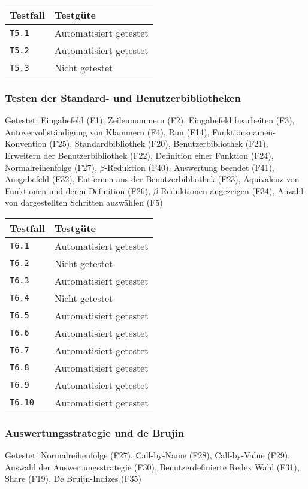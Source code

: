 \documentclass[parskip=full,11pt,twoside]{scrartcl}
\newcommand{\testline}[2]{
    \texttt{#1} & 
    \ifthenelse{\equal{#2}{Nicht getestet}}
        {\cellcolor{red!20}}
        {}
    \ifthenelse{\equal{#2}{Manuell getestet}}
        {\cellcolor{LimeGreen!20}}
        {}
    \ifthenelse{\equal{#2}{Automatisiert getestet}}
        {\cellcolor{green!20}}
        {}
    \ifthenelse{\equal{#2}{Nicht testbar}}
    {\cellcolor{gray!20}}
     {}
    #2 \\ \hline
}
\begin{document}
    \label{shortcuts}
    \begin{center}
        \begin{tabular}{ p{9cm} p{4cm}}
            Testfall & Testgüte \\ \hline
            \testline{T5.1}{Automatisiert getestet}
            \testline{T5.2}{Automatisiert getestet}
            \testline{T5.3}{Nicht getestet}
        \end{tabular}
    \end{center}

\subsubsection{Testen der Standard- und Benutzerbibliotheken}
    Getestet:
    Eingabefeld (F1),
    Zeilennummern (F2),
    Eingabefeld bearbeiten (F3),
    Autovervollständigung von Klammern (F4),
    Run (F14),
    Funktionsnamen-Konvention (F25),
    Standardbibliothek (F20),
    Benutzerbibliothek (F21),
    Erweitern der Benutzerbibliothek (F22),
    Definition einer Funktion (F24),
    Normalreihenfolge (F27),
    $\beta$-Reduktion (F40),
    Auswertung beendet (F41),
    Ausgabefeld (F32),
    Entfernen aus der Benutzerbibliothek (F23),
    Äquivalenz von Funktionen und deren Definition (F26),
    $\beta$-Reduktionen angezeigen (F34),
    Anzahl von dargestellten Schritten auswählen (F5)

    \label{shortcuts}
    \begin{center}
        \begin{tabular}{ p{9cm} p{4cm}}
            Testfall & Testgüte \\ \hline
            \testline{T6.1}{Automatisiert getestet}
            \testline{T6.2}{Nicht getestet}
            \testline{T6.3}{Automatisiert getestet}
            \testline{T6.4}{Nicht getestet}
            \testline{T6.5}{Automatisiert getestet}
            \testline{T6.6}{Automatisiert getestet}
            \testline{T6.7}{Automatisiert getestet}
            \testline{T6.8}{Automatisiert getestet}
            \testline{T6.9}{Automatisiert getestet}
            \testline{T6.10}{Automatisiert getestet}
        \end{tabular}
    \end{center}

\subsubsection{Auswertungsstrategie und de Brujin}
    Getestet:
    Normalreihenfolge (F27),
    Call-by-Name (F28),
    Call-by-Value (F29),
    Auswahl der Auswertungsstrategie (F30),
    Benutzerdefinierte Redex Wahl (F31),
    Share (F19),
    De Bruijn-Indizes (F35)
\end{document}
